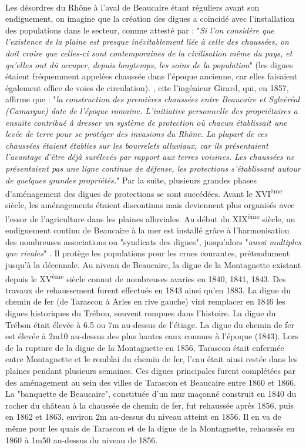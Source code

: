 \documentclass[11pt]{article}
\begin{document}
		\paragraph{} Les désordres du Rhône à l'aval de Beaucaire étant réguliers avant son endiguement, on imagine que la création des digues a coïncidé avec l'installation des populations dans le secteur, comme attesté par \citet{surell_memoire_1847} : "\textit{Si l'on considère que l'existence de la plaine est presque inévitablement liée à celle des chaussées, on doit croire que celles-ci sont contemporaines de la civilisation même du pays, et qu'elles ont dû occuper, depuis longtemps, les soins de la population}" (les digues étaient fréquemment appelées chaussée dans l'époque ancienne, car elles faisaient également office de voies de circulation). \citet{mejean_etude_2017}, cite l'ingénieur Girard, qui, en 1857, affirme que : "\textit{la construction des premières chaussées entre Beaucaire et Sylvéréal (Camargue) date de l'époque romaine. L'initiative personnelle des propriétaires a ensuite contribué à dresser un système de protection où chacun établissait une levée de terre pour se protéger des invasions du Rhône. La plupart de ces chaussées étaient établies sur les bourrelets alluviaux, car ils présentaient l'avantage d'être déjà surélevés par rapport aux terres voisines. Les chaussées ne présentaient pas une ligne continue de défense, les protections s'établissant autour de quelques grandes propriétés.}" Par la suite, plusieurs grandes phases d'aménagement des digues de protections se sont succédées. Avant le XVI\textsuperscript{ème} siècle, les aménagements étaient discontinus mais deviennent plus organisés avec l'essor de l'agriculture dans les plaines alluviales. Au début du XIX\textsuperscript{ème} siècle, un endiguement continu de Beaucaire à la mer est installé grâce à l'harmonisation des nombreuses associations ou "syndicats des digues", jusqu'alors "\textit{aussi multiples que rivales}" \citep{pichard_sept_2014}. Il protège les populations pour les crues courantes, prétendument jusqu'à la décennale. Au niveau de Beaucaire, la digue de la Montagnette existant depuis le XV\textsuperscript{ème} siècle connut de nombreuses avaries en 1840, 1841, 1843. Des travaux de rehaussement furent effectués en 1843 ainsi qu'en 1883. La digue du chemin de fer (de Tarascon à Arles en rive gauche) vint remplacer en 1846 les digues historiques du Trébon, souvent rompues dans l'histoire. La digue du Trébon était élevée à 6.5 ou 7m au-dessus de l'étiage. La digue du chemin de fer est élevée à 2m10 au-dessus des plus hautes eaux connues à l'époque (1843). Lors de la rupture de la digue de la Montagnette en 1856, Tarascon était enfermée entre Montagnette et le remblai du chemin de fer, l'eau était ainsi restée dans les plaines pendant plusieurs semaines. Ces digues principales furent complétées par des aménagement au sein des villes de Tarascon et Beaucaire entre 1860 et 1866. La "banquette de Beaucaire", constituée d'un mur maçonné construit en 1840 du rocher du château à la chaussée de chemin de fer, fut rehaussée après 1856, puis en 1862 et 1863, environ 2m au-dessus du niveau atteint en 1856. Il en va de même pour les quais de Tarascon et de la digue de la Montagnette, rehaussés en 1860 à 1m50 au-dessus du niveau de 1856.
		
\end{document}
